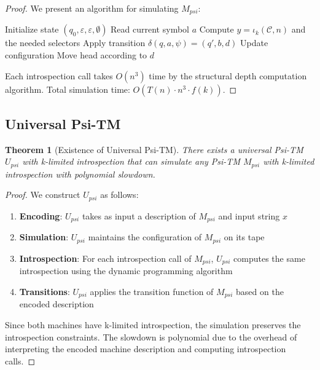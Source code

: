 \documentclass[11pt]{article}
\newtheorem{theorem}{Theorem}
\begin{document}
\begin{proof}
We present an algorithm for simulating $M_{psi}$:

\begin{algorithm}
\caption{Psi-TM Simulation}
\begin{algorithmic}
\STATE Initialize state $(q_0, \varepsilon, \varepsilon, \emptyset)$
    \STATE Read current symbol $a$
\STATE Compute $y = \iota_k(\mathcal{C},n)$ and the needed selectors
    \STATE Apply transition $\delta(q, a, \psi) = (q', b, d)$
    \STATE Update configuration
    \STATE Move head according to $d$
\ENDWHILE
\end{algorithmic}
\end{algorithm}

Each introspection call takes $O(n^3)$ time by the structural depth computation algorithm. Total simulation time: $O(T(n) \cdot n^3 \cdot f(k))$.
\end{proof}

\subsection{Universal Psi-TM}

\begin{theorem}[Existence of Universal Psi-TM]
There exists a universal Psi-TM $U_{psi}$ with k-limited introspection that can simulate any Psi-TM $M_{psi}$ with k-limited introspection with polynomial slowdown.
\end{theorem}

\begin{proof}
We construct $U_{psi}$ as follows:

\begin{enumerate}
\item \textbf{Encoding}: $U_{psi}$ takes as input a description of $M_{psi}$ and input string $x$
\item \textbf{Simulation}: $U_{psi}$ maintains the configuration of $M_{psi}$ on its tape
\item \textbf{Introspection}: For each introspection call of $M_{psi}$, $U_{psi}$ computes the same introspection using the dynamic programming algorithm
\item \textbf{Transitions}: $U_{psi}$ applies the transition function of $M_{psi}$ based on the encoded description
\end{enumerate}

Since both machines have k-limited introspection, the simulation preserves the introspection constraints. The slowdown is polynomial due to the overhead of interpreting the encoded machine description and computing introspection calls.
\end{proof}
\end{document}
